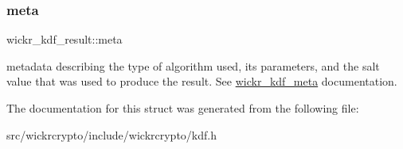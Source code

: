 \subsubsection{\texorpdfstring{meta}{meta}}
{\footnotesize\ttfamily wickr\+\_\+kdf\+\_\+result\+::meta}

metadata describing the type of algorithm used, it\textquotesingle{}s parameters, and the salt value that was used to produce the result. See \textquotesingle{}\mbox{\hyperlink{structwickr__kdf__meta}{wickr\+\_\+kdf\+\_\+meta}}\textquotesingle{} documentation. 

The documentation for this struct was generated from the following file\+:\begin{DoxyCompactItemize}
\item 
src/wickrcrypto/include/wickrcrypto/kdf.\+h\end{DoxyCompactItemize}
